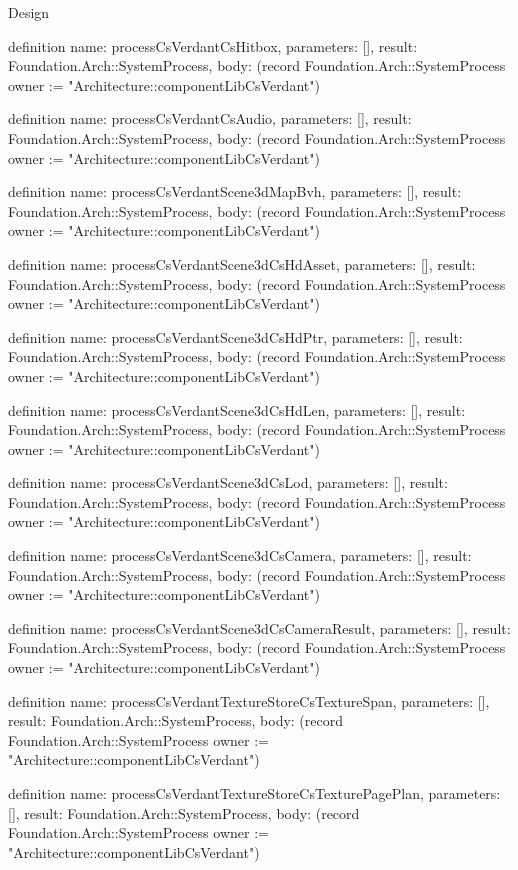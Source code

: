 \begin{lexlean}{Design}
\begin{semanticmodule}
definition{
  name: processCsVerdantCsHitbox,
  parameters: [],
  result: Foundation.Arch::SystemProcess,
  body: (record Foundation.Arch::SystemProcess {owner := "Architecture::componentLibCsVerdant"})
}

definition{
  name: processCsVerdantCsAudio,
  parameters: [],
  result: Foundation.Arch::SystemProcess,
  body: (record Foundation.Arch::SystemProcess {owner := "Architecture::componentLibCsVerdant"})
}

definition{
  name: processCsVerdantScene3dMapBvh,
  parameters: [],
  result: Foundation.Arch::SystemProcess,
  body: (record Foundation.Arch::SystemProcess {owner := "Architecture::componentLibCsVerdant"})
}

definition{
  name: processCsVerdantScene3dCsHdAsset,
  parameters: [],
  result: Foundation.Arch::SystemProcess,
  body: (record Foundation.Arch::SystemProcess {owner := "Architecture::componentLibCsVerdant"})
}

definition{
  name: processCsVerdantScene3dCsHdPtr,
  parameters: [],
  result: Foundation.Arch::SystemProcess,
  body: (record Foundation.Arch::SystemProcess {owner := "Architecture::componentLibCsVerdant"})
}

definition{
  name: processCsVerdantScene3dCsHdLen,
  parameters: [],
  result: Foundation.Arch::SystemProcess,
  body: (record Foundation.Arch::SystemProcess {owner := "Architecture::componentLibCsVerdant"})
}

definition{
  name: processCsVerdantScene3dCsLod,
  parameters: [],
  result: Foundation.Arch::SystemProcess,
  body: (record Foundation.Arch::SystemProcess {owner := "Architecture::componentLibCsVerdant"})
}

definition{
  name: processCsVerdantScene3dCsCamera,
  parameters: [],
  result: Foundation.Arch::SystemProcess,
  body: (record Foundation.Arch::SystemProcess {owner := "Architecture::componentLibCsVerdant"})
}

definition{
  name: processCsVerdantScene3dCsCameraResult,
  parameters: [],
  result: Foundation.Arch::SystemProcess,
  body: (record Foundation.Arch::SystemProcess {owner := "Architecture::componentLibCsVerdant"})
}

definition{
  name: processCsVerdantTextureStoreCsTextureSpan,
  parameters: [],
  result: Foundation.Arch::SystemProcess,
  body: (record Foundation.Arch::SystemProcess {owner := "Architecture::componentLibCsVerdant"})
}

definition{
  name: processCsVerdantTextureStoreCsTexturePagePlan,
  parameters: [],
  result: Foundation.Arch::SystemProcess,
  body: (record Foundation.Arch::SystemProcess {owner := "Architecture::componentLibCsVerdant"})
}


\end{semanticmodule}
\end{lexlean}
